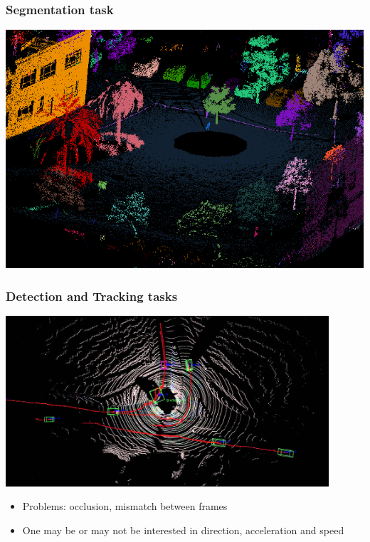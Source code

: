 \documentclass[xcolor=table,usenames,dvipsnames]{beamer}
\begin{document}
\begin{frame}
\frametitle{Segmentation task}
\begin{center}
\includegraphics[height=0.7\textheight]{img/segmentation.png}
\end{center}
\end{frame}
\begin{frame}
\frametitle{Detection and Tracking tasks}
\begin{center}
\includegraphics[width=0.9\textwidth]{img/tracking.jpg}
\end{center}
\begin{itemize}
\item Problems: occlusion, mismatch between frames
\item One may be or may not be interested in direction, acceleration and speed
\end{itemize}
\end{frame}
\end{document}
